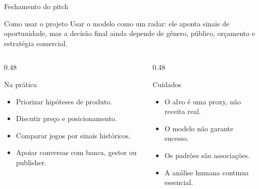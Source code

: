 \documentclass[aspectratio=169]{beamer}
\begin{document}
\begin{frame}{Fechamento do pitch}
\small

\begin{exampleblock}{Como usar o projeto}
Usar o modelo como um radar: ele aponta sinais de oportunidade, mas a decisão final ainda depende de gênero, público, orçamento e estratégia comercial.
\end{exampleblock}

\vspace{0.16cm}

\begin{columns}[T,onlytextwidth]
  \begin{column}{0.48\textwidth}
    \begin{block}{Na prática}
      \begin{itemize}
        \item Priorizar hipóteses de produto.
        \item Discutir preço e posicionamento.
        \item Comparar jogos por sinais históricos.
        \item Apoiar conversas com banca, gestor ou publisher.
      \end{itemize}
    \end{block}
  \end{column}

  \begin{column}{0.48\textwidth}
    \begin{block}{Cuidados}
      \begin{itemize}
        \item O alvo é uma proxy, não receita real.
        \item O modelo não garante sucesso.
        \item Os padrões são associações.
        \item A análise humana continua essencial.
      \end{itemize}
    \end{block}
  \end{column}
\end{columns}

\end{frame}
\end{document}
